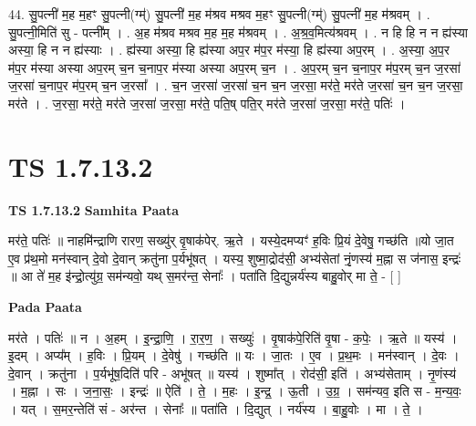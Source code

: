 \documentclass[17pt]{extarticle}
\begin{document}
44. सु॒पत्नी॑ म॒ह म॒हꣳ सु॒पत्नी(ग्म्॑) सु॒पत्नी॑ म॒ह म॑श्रव मश्रव म॒हꣳ सु॒पत्नी(ग्म्॑) सु॒पत्नी॑ म॒ह म॑श्रवम् । . सु॒पत्नी॒मिति॑ सु - पत्नी᳚म् । . अ॒ह म॑श्रव मश्रव म॒ह म॒ह म॑श्रवम् । . अ॒श्र॒व॒मित्य॑श्रवम् । . न हि हि न न ह्य॑स्या अस्या॒ हि न न ह्य॑स्याः । . ह्य॑स्या अस्या॒ हि ह्य॑स्या अप॒र म॑प॒र म॑स्या॒ हि ह्य॑स्या अप॒रम् । . अ॒स्या॒ अ॒प॒र म॑प॒र म॑स्या अस्या अप॒रम् च॒न च॒नाप॒र म॑स्या अस्या अप॒रम् च॒न । . अ॒प॒रम् च॒न च॒नाप॒र म॑प॒रम् च॒न ज॒रसा॑ ज॒रसा॑ च॒नाप॒र म॑प॒रम् च॒न ज॒रसा᳚ । . च॒न ज॒रसा॑ ज॒रसा॑ च॒न च॒न ज॒रसा॒ मर॑ते॒ मर॑ते ज॒रसा॑ च॒न च॒न ज॒रसा॒ मर॑ते । . ज॒रसा॒ मर॑ते॒ मर॑ते ज॒रसा॑ ज॒रसा॒ मर॑ते॒ पति॒ष् पति॒र् मर॑ते ज॒रसा॑ ज॒रसा॒ मर॑ते॒ पतिः॑ । \newline
\pagebreak
{}
\section*{ TS 1.7.13.2 }

\textbf{TS 1.7.13.2 } \newline
\textbf{Samhita Paata} \newline

मर॑ते॒ पतिः॑ ॥ नाहमि॑न्द्राणि रारण॒ सख्यु॑र् वृ॒षाक॑पेर्. ऋ॒ते । यस्ये॒दमप्यꣳ॑ ह॒विः प्रि॒यं दे॒वेषु॒ गच्छ॑ति ॥यो जा॒त ए॒व प्र॑थ॒मो मन॑स्वान् दे॒वो दे॒वान् क्रतु॑ना प॒र्यभू॑षत् । यस्य॒ शुष्मा॒द्रोद॑सी॒ अभ्य॑सेतां नृं॒णस्य॑ म॒ह्ना स ज॑नास॒ इन्द्रः॑ ॥ आ ते॑ म॒ह इ॑न्द्रो॒त्यु॑ग्र॒ सम॑न्यवो॒ यथ् स॒मर॑न्त॒ सेनाः᳚ । पता॑ति दि॒द्युन्नर्य॑स्य बाहु॒वोर् मा ते॒ - [ ] \newline

\textbf{Pada Paata} \newline

मर॑ते । पतिः॑ ॥ न । अ॒हम् । इ॒न्द्रा॒णि॒ । रा॒र॒ण॒ । सख्युः॑ । वृ॒षाक॑पे॒रिति॑ वृ॒षा - क॒पेः॒ । ऋ॒ते ॥ यस्य॑ । इ॒दम् । अप्य᳚म् । ह॒विः । प्रि॒यम् । दे॒वेषु॑ । गच्छ॑ति ॥ यः । जा॒तः । ए॒व । प्र॒थ॒मः । मन॑स्वान् । दे॒वः । दे॒वान् । क्रतु॑ना । प॒र्यभू॑ष॒दिति॑ परि - अभू॑षत् ॥ यस्य॑ । शुष्मा᳚त् । रोद॑सी॒ इति॑ । अभ्य॑सेताम् । नृ॒णंस्य॑ । म॒ह्ना । सः । ज॒ना॒सः॒ । इन्द्रः॑ ॥ ऐति॑ । ते॒ । म॒हः । इ॒न्द्र॒ । ऊ॒ती । उ॒ग्र॒ । सम॑न्यव॒ इति स - म॒न्य॒वः॒ । यत् । स॒मर॒न्तेति॑ सं - अर॑न्त । सेनाः᳚ ॥ पता॑ति । दि॒द्युत् । नर्य॑स्य । बा॒हु॒वोः । मा । ते॒ ।  \newline
\end{document}
